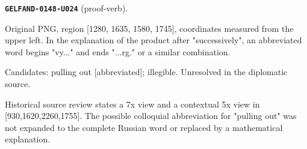\documentclass[11pt]{article}
\theoremstyle{definition}
\theoremstyle{remark}
\begin{document}
\noindent\leavevmode{}\label{GELFAND-P001364:proof-verb:note}\textbf{\texttt{GELFAND-0148-U024}} (proof-verb).\par\nopagebreak[4]
Original PNG, region [1280, 1635, 1580, 1745], coordinates measured from the upper left. In the explanation of the product after "successively", an abbreviated word begins "vy..." and ends "...rg." or a similar combination.\par
Candidates: pulling out [abbreviated]; illegible. Unresolved in the diplomatic source.\par
Historical source review states a 7x view and a contextual 5x view in [930,1620,2260,1755]. The possible colloquial abbreviation for "pulling out" was not expanded to the complete Russian word or replaced by a mathematical explanation.\par\medskip
\end{document}
